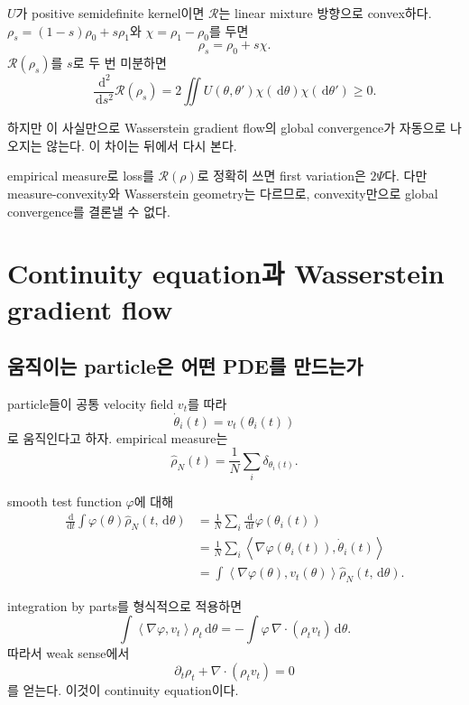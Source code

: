 \documentclass[11pt,a4paper,oneside,openany]{memoir}
\newcommand{\Risk}{\mathcal{R}}
\newcommand{\grad}{\nabla}
\newcommand{\dd}{\,\mathrm{d}}
\newcommand{\diver}{\nabla\!\cdot}
\newcommand{\inner}[2]{\left\langle #1,#2\right\rangle}
\theoremstyle{definition}
\begin{document}
$U$가 positive semidefinite kernel이면 $\Risk$는 linear mixture 방향으로 convex하다.
$\rho_s=(1-s)\rho_0+s\rho_1$와 $\chi=\rho_1-\rho_0$를 두면
\[
  \rho_s=\rho_0+s\chi.
\]
$\Risk(\rho_s)$를 $s$로 두 번 미분하면
\[
  \frac{\dd^2}{\dd s^2}\Risk(\rho_s)
  =2\iint U(\theta,\theta')\chi(\dd\theta)\chi(\dd\theta')\ge0.
\]

하지만 이 사실만으로 Wasserstein gradient flow의 global convergence가 자동으로 나오지는 않는다.
이 차이는 뒤에서 다시 본다.

\begin{presentboxcompact}
empirical measure로 loss를 $\Risk(\rho)$로 정확히 쓰면 first variation은 $2\Psi$다.
다만 measure-convexity와 Wasserstein geometry는 다르므로, convexity만으로 global convergence를 결론낼 수 없다.
\end{presentboxcompact}

\endgroup
\chapter{Continuity equation과 Wasserstein gradient flow}

\section{움직이는 particle은 어떤 PDE를 만드는가}

particle들이 공통 velocity field $v_t$를 따라
\[
  \dot\theta_i(t)=v_t(\theta_i(t))
\]
로 움직인다고 하자. empirical measure는
\[
  \hat\rho_N(t)=\frac1N\sum_i\delta_{\theta_i(t)}.
\]

smooth test function $\varphi$에 대해
\begin{align*}
\frac{\dd}{\dd t}\int\varphi(\theta)\hat\rho_N(t,\dd\theta)
&=\frac1N\sum_i\frac{\dd}{\dd t}\varphi(\theta_i(t))\\
&=\frac1N\sum_i\inner{\grad\varphi(\theta_i(t))}{\dot\theta_i(t)}\\
&=\int\inner{\grad\varphi(\theta)}{v_t(\theta)}\hat\rho_N(t,\dd\theta).
\end{align*}

integration by parts를 형식적으로 적용하면
\[
\int\inner{\grad\varphi}{v_t}\rho_t\dd\theta
=-\int\varphi\,\diver(\rho_tv_t)\dd\theta.
\]
따라서 weak sense에서
\begin{equation}
\boxed{
  \partial_t\rho_t+\diver(\rho_tv_t)=0
}
\label{eq:continuity}
\end{equation}
를 얻는다. 이것이 continuity equation이다.
\end{document}
